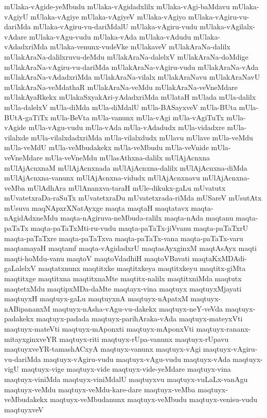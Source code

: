 {mUlaka-vAgide-yeMbudu
mUlaka-vAgidadxlilx
mUlaka-vAgi-baMdavu
mUlaka-vAgiyU
mUlaka-vAgiye
mUlaka-vAgiyeV
mUlaka-vAgiyo
mUlaka-vAgiru-vu-dariMda
mUlaka-vAgiru-vu-dariMdalU
mUlaka-vAgiru-vudu
mUlaka-vAgilalx-vAdare
mUlaka-vAgu-vudu
mUlaka-vAda
mUlaka-vAdudu
mUlaka-vAdadxriMda
mUlaka-venunx-vudeVke
mUlakaveV
mUlakAraNa-dalilx
mUlakAraNa-dalilxruvu-deMdu
mUlakAraNa-dalelxV
mUlakAraNa-doMdige
mUlakAraNa-vAgiru-vu-dariMda
mUlakAraNa-vAgiru-vudu
mUlakAraNa-vAda
mUlakAraNa-vAdadxriMda
mUlakAraNa-vilalx
mUlakAraNavu
mUlakAraNavU
mUlakAraNa-veMdathaR
mUlakAraNa-veMdu
mUlakAraNa-veVneMdare
mUlakAyaRkekx
mUlakaSxyakAri-yAdadxriMda
mUlataH
mUlada
mUla-dalilx
mUla-dalelxV
mUla-diMda
mUla-diMdalU
mUla-BASayxveV
mUla-BUta
mUla-BUtA-gaTiTx
mUla-BeVta
mUla-vanunx
mUla-vAgi
mUla-vAgiTuTx
mUla-vAgide
mUla-vAgu-vudu
mUla-vAda
mUla-vAdadudx
mUla-vidadxre
mUla-vilalxde
mUla-vilalxdadxriMda
mUla-vilalxdudx
mUlavu
mUlave
mUla-veMdu
mUla-veMdU
mUla-veMbudakekx
mUla-veMbudu
mUla-veVnide
mUla-veVneMdare
mUla-veVneMdu
mUlasAthxna-dalilx
mUlAjAcnxna
mUlAjAcnxnaM
mUlAjAcnxnada
mUlAjAcnxna-dalilx
mUlAjAcnxna-diMda
mUlAjAcnxna-vanunx
mUlAjAcnxna-vidudx
mUlAjAcnxnavu
mUlAjAcnxna-veMba
mUlAdhAra
mUlAnanxva-taraH
mUle-dikukx-gaLu
mUvatutx
mUvatetxraDa-raSuTx
mUvatetxraDu
mUvatetxrada-riMda
mUSareV
mUsutAtx
mUsuva
maqNApxrXNatAyxge
maqta
maqtaH
maqtatavx
maqta-nAgidAdxneMdu
maqta-nAgiruva-neMbuda-ralilx
maqta-nAda
maqtanu
maqta-paTaTx
maqta-paTaTxMti-ru-vudu
maqta-paTaTx-jiVvanu
maqta-paTaTxrU
maqta-paTaTxre
maqta-paTaTxva
maqta-paTaTx-vana
maqta-paTaTx-varu
maqtamayaH
maqtamf
maqta-vAgidadxrU
maqtasAyxginxM
maqtAsAyx
maqti
maqti-hoMdu-vanu
maqtoV
maqtoVdadhiH
maqtoVBavati
maqtaKxMDAdi-gaLalelxV
maqtatxnunx
maqtitxke
maqtitxkeya
maqtitxkeyu
maqtitx-giMta
maqtitxge
maqtitxna
maqtitxnaMte
maqtitx-nalilx
maqtitxniMda
maqtutx
maqtetxMdu
maqtipxMDa-daMte
maqtayx-vina
maqtuyx
maqtuyxMjayati
maqtuyxH
maqtuyx-gaLu
maqtuyxnA
maqtuyx-nApatxM
maqtuyx-nABipananxM
maqtuyx-nAsha-vAgu-vu-dakekx
maqtuyx-neY-veVda
maqtuyx-padakekx
maqtuyx-padada
maqtuyx-parihAraka-vAda
maqtuyx-mateyxVti
maqtuyx-mateVti
maqtuyx-mAponxti
maqtuyx-mAponxVti
maqtuyx-rananx-mitayxginxveYR
maqtuyx-riti
maqtuyx-rUpa-vanunx
maqtuyx-rUpavu
maqtuyxveYR-tamashACxyA
maqtuyx-vanunx
maqtuyx-vAgi
maqtuyx-vAgiru-vu-dariMda
maqtuyx-vAgiru-vudu
maqtuyx-vAgu-vudu
maqtuyx-vAda
maqtuyx-vigU
maqtuyx-vige
maqtuyx-vide
maqtuyx-vide-yeMdare
maqtuyx-vina
maqtuyx-viniMda
maqtuyx-viniMdalU
maqtuyxvu
maqtuyx-vuLaLx-vanAgu
maqtuyx-veMdu
maqtuyx-veMdu-kare-dare
maqtuyx-veMba
maqtuyx-veMbudakekx
maqtuyx-veMbudanunx
maqtuyx-veMbudu
maqtuyx-venisu-vudu
maqtuyxveV
}
